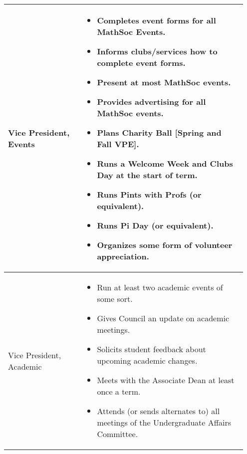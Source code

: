 \begin{longtable}{p{0.3\linewidth} p{0.65\linewidth}}
\midrule
Vice President, Events & 
\begin{itemize}
\item Completes event forms for all MathSoc Events.
\item Informs clubs/services how to complete event forms.
\item Present at most MathSoc events.
\item Provides advertising for all MathSoc events.
\item Plans Charity Ball [Spring and Fall VPE].
\item Runs a Welcome Week and Clubs Day at the start of term.
\item Runs Pints with Profs (or equivalent).
\item Runs Pi Day (or equivalent).
\item Organizes some form of volunteer appreciation.
\end{itemize}
\\
\midrule
Vice President, Academic &
\begin{itemize}
\item Run at least two academic events of some sort.
\item Gives Council an update on academic meetings.
\item Solicits student feedback about upcoming academic changes.
\item Meets with the Associate Dean at least once a term.
\item Attends (or sends alternates to) all meetings of the Undergraduate Affairs Committee.
\end{itemize}
\\
\bottomrule
\end{longtable}